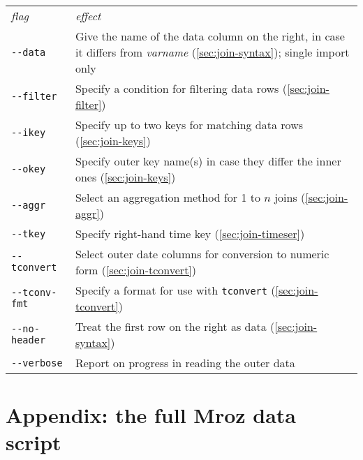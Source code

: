 \begin{center}
\begin{tabular}{lp{}}
  \textit{flag} & \textit{effect} \\ [6pt]
  \verb|--data| & Give the name of the data column on the right, in
                  case it differs from \textsl{varname}
                  (\ref{sec:join-syntax}); single import only  \\
  \verb|--filter| & Specify a condition for filtering data rows
                    (\ref{sec:join-filter}) \\
  \verb|--ikey| & Specify up to two keys for matching data rows
                  (\ref{sec:join-keys}) \\
  \verb|--okey| & Specify outer key name(s) in case they
                  differ the inner ones (\ref{sec:join-keys})\\
  \verb|--aggr| & Select an aggregation method for 1 to $n$ joins
                 (\ref{sec:join-aggr}) \\ 
  \verb|--tkey| & Specify right-hand time key (\ref{sec:join-timeser}) \\
  \verb|--tconvert| & Select outer date columns for conversion to
                      numeric form (\ref{sec:join-tconvert}) \\
  \verb|--tconv-fmt| & Specify a format for use with \texttt{tconvert} 
                       (\ref{sec:join-tconvert}) \\
  \verb|--no-header| & Treat the first row on the right as data
                       (\ref{sec:join-syntax}) \\
  \verb|--verbose| & Report on progress in reading the outer data
\end{tabular}
\end{center}


\pagebreak[4]

\section*{Appendix: the full Mroz data script}

